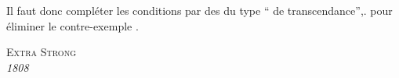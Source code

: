 Il faut donc compléter les conditions   par des   du type `` de transcendance'',. pour éliminer le contre-exemple .

{\centering \textsc{Extra Strong}\\
\textit{ 1808}\par}
